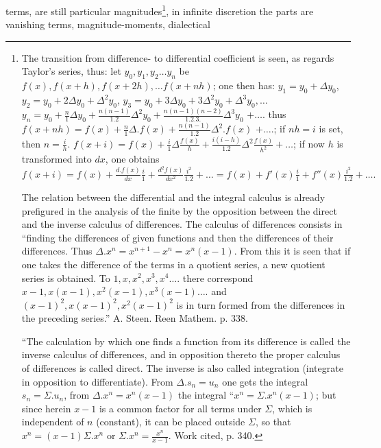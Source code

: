 \documentclass[12pt,a4paper,openany]{book}
\newcommand{\opage}[1]{\marginnote{\footnotesize\textit{[#1]}}}
\begin{document}
terms, are still particular magnitudes\footnote[1]{The transition from difference- to differential coefficient is seen, as regards Taylor's series, thus: let $y_{0}, y_{1}, y_{2} \ldots y_{n}$ be $f(x), f(x+h), f(x+2h), \ldots f(x+nh)$; one then has: $y_{1}=y_{0}+\Delta y_{0}$, $y_{2}=y_{0}+2\Delta y_{0}+\Delta^{2}y_{0}$, $y_{3}=y_{0}+3\Delta y_{0}+3\Delta^{2}y_{0}+\Delta^{3}y_{0}, \ldots$ $y_{n}=y_{0}+\frac{n}{1}\Delta y_{0}+\frac{n(n-1)}{1.2}\Delta^{2}y_{0}+\frac{n(n-1)(n-2)}{1.2.3.}\Delta^{3}y_{0}$ $+\ldots$. thus $f(x+nh)=f(x)+\frac{n}{1}\Delta.f(x)+\frac{n(n-1)}{1.2}\Delta^{2}.f(x)$ $+\ldots.$; if $nh=i$ is set, then $n=\frac{i}{h}$. $f(x+i)=f(x)+\frac{i}{1}\Delta\frac{f(x)}{h}+\frac{i(i-h)}{1.2}\Delta^{2}\frac{f(x)}{h^{2}}+\ldots$; if now $h$ is transformed into $dx$, one obtains $f(x+i)=f(x)+\frac{d.f(x)}{dx}\frac{i}{1}+\frac{d^{2}f(x)}{dx^{2}}\frac{i^{2}}{1.2}+\ldots=f(x)+f'(x)\frac{i}{1}+f''(x)\frac{i^{2}}{1.2}+\ldots.$\par The relation between the differential and the integral calculus is already prefigured in the analysis of the finite by the opposition between the direct and the inverse calculus of differences. The calculus of differences consists in ``finding the differences of given functions and then the differences of their differences. Thus $\Delta.x^{n}=x^{n+1}-x^{n}=x^{n}(x-1)$. From this it is seen that if one takes the difference of the terms in a quotient series, a new quotient series is obtained. To $1, x, x^{2}, x^{3}, x^{4} \ldots.$ there correspond $x-1, x(x-1), x^{2}(x-1), x^{3}(x-1)\ldots.$ and $(x-1)^{2}, x(x-1)^{2}, x^{2}(x-1)^{2}$ is in turn formed from the differences in the preceding series.'' A. Steen. Reen Mathem. p. 338.\par ``The calculation by which one finds a function from its difference is called the inverse calculus of differences, and in opposition thereto the proper calculus of differences is called direct. The inverse is also called integration (integrate in opposition to differentiate). From $\Delta.s_{n}=u_{n}$ one gets the integral $s_{n}=\Sigma.u_{n}$, from $\Delta.x^{n}=x^{n}(x-1)$ the integral ``$x^{n}=\Sigma.x^{n}(x-1)$; but since herein $x-1$ is a common factor for all terms under $\Sigma$, which is independent of $n$ (constant), it can be placed outside $\Sigma$, so that $x^{n}=(x-1)\Sigma.x^{n}$ or $\Sigma.x^{n}=\frac{x^{n}}{x-1}$. Work cited, p. 340.}, in infinite discretion
\setcounter{footnote}{0}%
\opage{101}the parts are vanishing terms, magnitude-moments, dialectical
\end{document}
